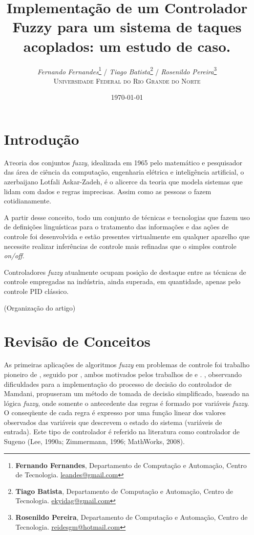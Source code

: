 \documentclass[
	twoside,				%
	twocolumn,				%
	english,				%
	brazil,					%
]{article}
\title{Implementação de um Controlador Fuzzy para um sistema de taques acoplados: um estudo de caso.}
\author{
\textit{Fernando Fernandes}\thanks{\textbf{Fernando Fernandes}, Departamento de Computação e Automação, Centro de Tecnologia. \href{mailto:leandes@gmail.com}{leandes@gmail.com}} / 
\textit{Tiago Batista}\thanks{\textbf{Tiago Batista}, Departamento de Computação e Automação, Centro de Tecnologia. \href{mailto:ekyidag@gmail.com}{ekyidag@gmail.com}} / 
\textit{Rosenildo Pereira}\thanks{\textbf{Rosenildo Pereira}, Departamento de Computação e Automação, Centro de Tecnologia. \href{mailto:reidesgm@hotmail.com}{reidesgm@hotmail.com}} \\ [1ex]
\textsc{Universidade Federal do Rio Grande do Norte} \\
}
\date{\today} %
\begin{document}
\maketitle


\section{Introdução}
\lettrine[nindent=0em,lines=3]{A} teoria dos conjuntos \textit{fuzzy}, idealizada em 1965 pelo matemático e pesquisador das área de ciência da computação, engenharia elétrica e inteligência artificial, o azerbaijano Lotfali Askar-Zadeh, é o alicerce da teoria que modela sistemas que lidam com dados e regras imprecisas. Assim como as pessoas o fazem cotidianamente.

A partir desse conceito, todo um conjunto de técnicas e tecnologias que fazem uso de definições linguísticas para o tratamento das informações e das ações de controle foi desenvolvida e estão presentes virtualmente em qualquer aparelho que necessite realizar inferências de controle mais refinadas que o simples controle \textit{on/off}.

Controladores \textit{fuzzy} atualmente ocupam posição de destaque entre as técnicas de controle empregadas na indústria, ainda superada, em quantidade, apenas pelo controle PID clássico.

(Organização do artigo)

\section{Revisão de Conceitos}

As primeiras aplicações de algoritmos \textit{fuzzy} em problemas de controle foi trabalho pioneiro de \cite{Mamdani:1973}, seguido por \cite{Sugeno:1985}, ambos motivados pelos trabalhos de \cite{Zadeh:1965} e \cite{Zadeh:1973}. \cite{TakagiSugeno:1983}, observando dificuldades para a implementação do processo de decisão do controlador de Mamdani, propuseram um método de tomada de decisão simplificado, baseado na lógica \textit{fuzzy}, onde somente o antecedente das regras é formado por variáveis \textit{fuzzy}. O conseqüente de cada regra é expresso por uma função linear dos valores observados das variáveis que descrevem o estado do sistema (variáveis de entrada). Este tipo de controlador é referido na literatura como controlador de Sugeno (Lee, 1990a; Zimmermann, 1996; MathWorks, 2008).
\end{document}
